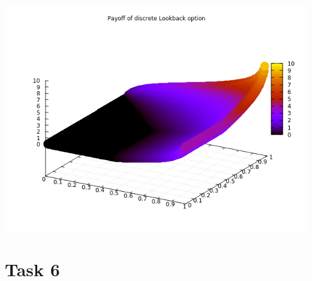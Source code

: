 \documentclass[10pt,a4paper]{article}
\begin{document}
\begin{center}
	\includegraphics[scale=0.7]{payoff_lookback.png}
\end{center}

\section*{Task 6}
\end{document}
